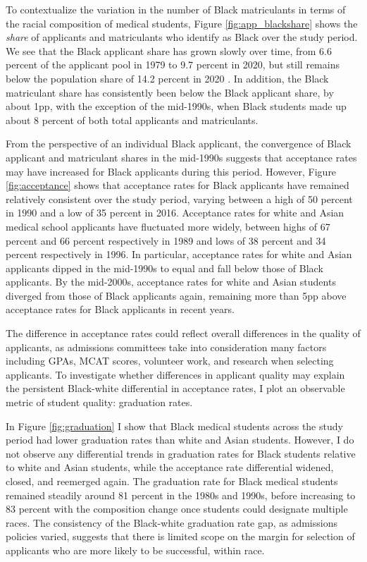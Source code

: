 \documentclass[12pt]{article}
\begin{document}
To contextualize the variation in the number of Black matriculants in terms of the racial composition of medical students, Figure \ref{fig:app_blackshare} shows the \textit{share} of applicants and matriculants who identify as Black over the study period. We see that the Black applicant share has grown slowly over time, from 6.6 percent of the applicant pool in 1979 to 9.7 percent in 2020, but still remains below the population share of 14.2 percent in 2020 \citep{jones_2020_2021}. In addition, the Black matriculant share has consistently been below the Black applicant share, by about 1pp, with the exception of the mid-1990s, when Black students made up about 8 percent of both total applicants and matriculants. 

From the perspective of an individual Black applicant, the convergence of Black applicant and matriculant shares in the mid-1990s suggests that acceptance rates may have increased for Black applicants during this period. However, Figure \ref{fig:acceptance} shows that acceptance rates for Black applicants have remained relatively consistent over the study period, varying between a high of 50 percent in 1990 and a low of 35 percent in 2016. Acceptance rates for white and Asian medical school applicants have fluctuated more widely, between highs of 67 percent and 66 percent respectively in 1989 and lows of 38 percent and 34 percent respectively in 1996. In particular, acceptance rates for white and Asian applicants dipped in the mid-1990s to equal and fall below those of Black applicants. By the mid-2000s, acceptance rates for white and Asian students diverged from those of Black applicants again, remaining more than 5pp above acceptance rates for Black applicants in recent years.

The difference in acceptance rates could reflect overall differences in the quality of applicants, as admissions committees take into consideration many factors including GPAs, MCAT scores, volunteer work, and research when selecting applicants. To investigate whether differences in applicant quality may explain the persistent Black-white differential in acceptance rates, I plot an observable metric of student quality: graduation rates. 

In Figure \ref{fig:graduation} I show that Black medical students across the study period had lower graduation rates than white and Asian students. However, I do not observe any differential trends in graduation rates for Black students relative to white and Asian students, while the acceptance rate differential widened, closed, and reemerged again. The graduation rate for Black medical students remained steadily around 81 percent in the 1980s and 1990s, before increasing to 83 percent with the composition change once students could designate multiple races. The consistency of the Black-white graduation rate gap, as admissions policies varied, suggests that there is limited scope on the margin for selection of applicants who are more likely to be successful, within race. 
\end{document}
